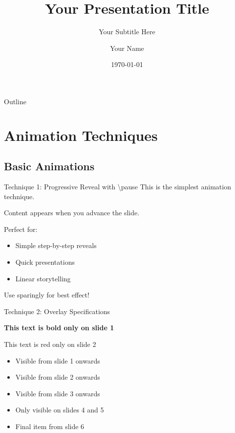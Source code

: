 \documentclass[aspectratio=169]{beamer}
\title{Your Presentation Title}
\subtitle{Your Subtitle Here}
\author{Your Name}
\institute{Your Institution}
\date{\today}
\begin{document}
\begin{frame}
    \titlepage
\end{frame}

\begin{frame}{Outline}
    \tableofcontents[pausesections]
\end{frame}

\section{Animation Techniques}

\subsection{Basic Animations}

\begin{frame}{Technique 1: Progressive Reveal with \textbackslash pause}
    This is the simplest animation technique.
    \pause
    
    Content appears when you advance the slide.
    \pause
    
    Perfect for:
    \pause
    \begin{itemize}
        \item Simple step-by-step reveals
        \pause
        \item Quick presentations
        \pause
        \item Linear storytelling
    \end{itemize}
    \pause
    
    \alert{Use sparingly for best effect!}
\end{frame}

\begin{frame}{Technique 2: Overlay Specifications}
    
    \textbf<1>{This text is bold only on slide 1}
    
    \textcolor<2>{themered}{This text is red only on slide 2}
    
    \begin{itemize}
        \item<1-> Visible from slide 1 onwards
        \item<2-> Visible from slide 2 onwards
        \item<3-> Visible from slide 3 onwards
        \item<4-5> Only visible on slides 4 and 5
        \item<6-> Final item from slide 6
    \end{itemize}
    
\end{frame}
\end{document}
